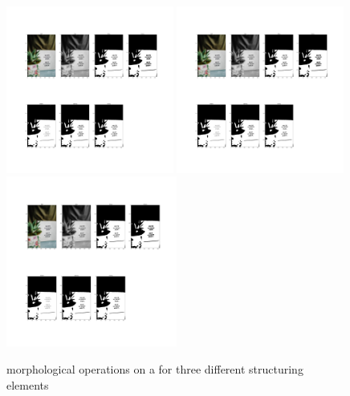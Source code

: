 \documentclass{article}
\begin{document}
{{        \begin{figure}[htp]
            \centering
            \includegraphics[width=0.49\textwidth]{Assignment-8/fig1.jpg}
            \includegraphics[width=0.49\textwidth]{Assignment-8/fig2.jpg}
            \includegraphics[width=0.5\textwidth]{Assignment-8/fig3.jpg}
            \caption{morphological operations on a for three different structuring elements}
        \end{figure}
    }
}
\clearpage
\end{document}
